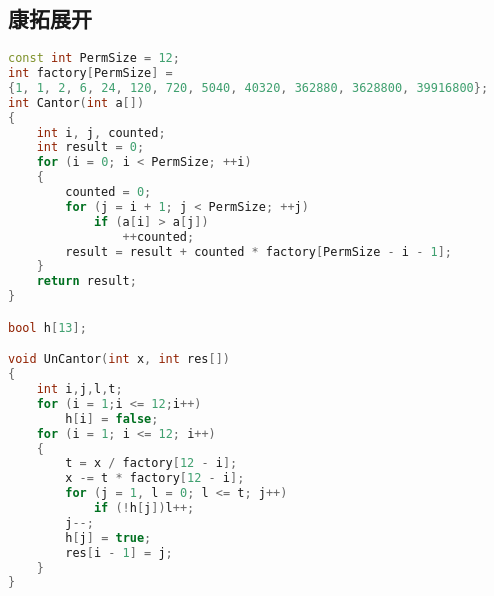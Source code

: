 \subsection{康拓展开}
	\begin{lstlisting}[language=c++]
const int PermSize = 12;
int factory[PermSize] = 
{1, 1, 2, 6, 24, 120, 720, 5040, 40320, 362880, 3628800, 39916800};
int Cantor(int a[])
{
	int i, j, counted;
	int result = 0;
	for (i = 0; i < PermSize; ++i)
	{
		counted = 0;
		for (j = i + 1; j < PermSize; ++j)
			if (a[i] > a[j])
				++counted;
		result = result + counted * factory[PermSize - i - 1];
	}
	return result;
}

bool h[13];

void UnCantor(int x, int res[])
{
	int i,j,l,t;
	for (i = 1;i <= 12;i++)
		h[i] = false;
	for (i = 1; i <= 12; i++)
	{
		t = x / factory[12 - i];
		x -= t * factory[12 - i];
		for (j = 1, l = 0; l <= t; j++)
			if (!h[j])l++;
		j--;
		h[j] = true;
		res[i - 1] = j;
	}
}
	\end{lstlisting}